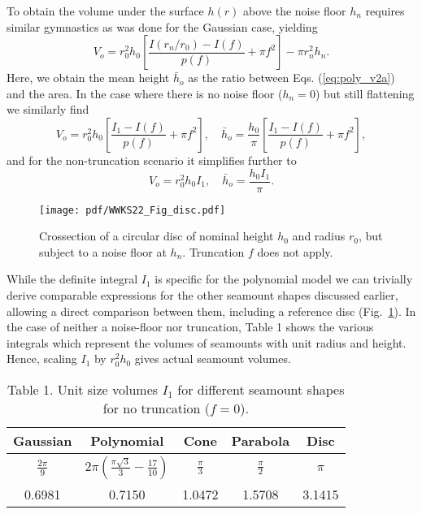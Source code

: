 To obtain the volume under the surface $h(r)$ above the noise floor $h_n$ requires similar gymnastics
as was done for the Gaussian case, yielding
\begin{equation}
	V_o = r_0^2 h_0 \left [ \frac{I(r_n/r_0) - I(f)}{p(f)} + \pi f^2 \right ] - \pi r_n^2h_n.
	\label{eq:poly_v2a}
\end{equation}
Here, we obtain the mean height $\bar{h}_o$ as the ratio between Eqs. (\ref{eq:poly_v2a}) and the area.
In the case where there is no noise floor ($h_n = 0$) but still flattening we similarly find
\begin{equation*}
	V_o = r_0^2 h_0 \left [ \frac{I_1 - I(f)}{p(f)} + \pi f^2 \right ],\quad\bar{h}_o = \frac{h_0}{\pi}\left [ \frac{I_1 - I(f)}{p(f)} + \pi f^2 \right ],
\end{equation*}
and for the non-truncation scenario it simplifies further to
\begin{equation*}
	V_o = r_0^2 h_0 I_1, \quad \bar{h}_o = \frac{h_0 I_1}{\pi}.
\end{equation*}

\begin{figure}[h]
\centering
\noindent\texttt{[image: pdf/WWKS22\_Fig\_disc.pdf]}
\caption{Crossection of a circular disc of nominal height $h_0$ and radius
$r_0$, but subject to a noise floor at $h_n$. Truncation $f$ does not apply.}
\label{WWKS22_Fig_disc}
\end{figure}

While the definite integral $I_1$ is specific for the polynomial model
we can trivially derive comparable expressions for the other seamount shapes discussed earlier,
allowing a direct comparison between them, including a reference disc (Fig.~\ref{WWKS22_Fig_disc}). In the
case of neither a noise-floor nor truncation, Table 1 shows the various integrals which represent
the volumes of seamounts with unit radius and height.  Hence, scaling $I_1$ by $r_0^2 h_0$
gives actual seamount volumes.

\begin{table}[h]
\centering
\begin{tabular}{c c c c c} \hline
  \bf{Gaussian}  &                               \bf{Polynomial}                  &  \bf{Cone}  &    \bf{Parabola}    & \bf{Disc}  \\ \hline
$\frac{2\pi}{9}$ & $2 \pi\left (\frac{\pi \sqrt{3}}{3} - \frac{17}{10} \right )$ & $\frac{\pi}{3}$ & $\frac{\pi}{2}$ &   $\pi$    \\ 
      0.6981      &                               0.7150                           &      1.0472     &       1.5708    &   3.1415   \\ \hline
\end{tabular}
\caption{Table 1. Unit size volumes $I_1$ for different seamount shapes for no truncation ($f = 0$).}
\label{tbl:Ival}
\end{table}

